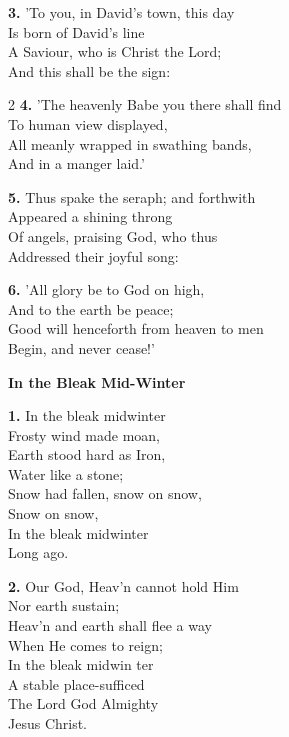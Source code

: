 \documentclass[a5paper,12pt]{article}
\begin{document}
\textbf{3.} 'To you, in David's town, this day\\
Is born of David's line\\
A Saviour, who is Christ the Lord;\\
And this shall be the sign:

\begin{multicols}{2}
\small
\textbf{4.} 'The heavenly Babe you there shall find\\
To human view displayed,\\
All meanly wrapped in swathing bands,\\
And in a manger laid.'

\textbf{5.} Thus spake the seraph; and forthwith\\
Appeared a shining throng\\
Of angels, praising God, who thus\\
Addressed their joyful song:

\textbf{6.} 'All glory be to God on high,\\
And to the earth be peace;\\
Good will henceforth from heaven to men\\
Begin, and never cease!'

\end{multicols}
\newpage

\begin{center}{\Large\bfseries In the Bleak Mid-Winter}\end{center}
\vspace{0.3em}
\textbf{1.} In the bleak midwinter\\
Frosty wind made moan,\\
Earth stood hard as Iron,\\
Water like a stone;\\
Snow had fallen, snow on snow,\\
Snow on snow,\\
In the bleak midwinter\\
Long ago.

\textbf{2.} Our God, Heav'n cannot hold Him\\
Nor earth sustain;\\
Heav'n and earth shall flee a way\\
When He comes to reign;\\
In the bleak midwin ter\\
A stable place-sufficed\\
The Lord God Almighty\\
Jesus Christ.
\end{document}
